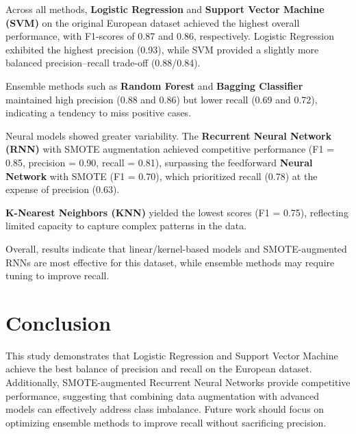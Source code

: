 \documentclass{article}
\begin{document}
Across all methods, \textbf{Logistic Regression} and \textbf{Support Vector Machine (SVM)} on the original European dataset achieved the highest overall performance, with F1-scores of 0.87 and 0.86, respectively. Logistic Regression exhibited the highest precision (0.93), while SVM provided a slightly more balanced precision–recall trade-off (0.88/0.84).

Ensemble methods such as \textbf{Random Forest} and \textbf{Bagging Classifier} maintained high precision (0.88 and 0.86) but lower recall (0.69 and 0.72), indicating a tendency to miss positive cases.

Neural models showed greater variability. The \textbf{Recurrent Neural Network (RNN)} with SMOTE augmentation achieved competitive performance (F1 = 0.85, precision = 0.90, recall = 0.81), surpassing the feedforward \textbf{Neural Network} with SMOTE (F1 = 0.70), which prioritized recall (0.78) at the expense of precision (0.63).

\textbf{K-Nearest Neighbors (KNN)} yielded the lowest scores (F1 = 0.75), reflecting limited capacity to capture complex patterns in the data.

Overall, results indicate that linear/kernel-based models and SMOTE-augmented RNNs are most effective for this dataset, while ensemble methods may require tuning to improve recall.


\section*{Conclusion}

This study demonstrates that Logistic Regression and Support Vector Machine achieve the best balance of precision and recall on the European dataset. Additionally, SMOTE-augmented Recurrent Neural Networks provide competitive performance, suggesting that combining data augmentation with advanced models can effectively address class imbalance. Future work should focus on optimizing ensemble methods to improve recall without sacrificing precision.




\end{document}

